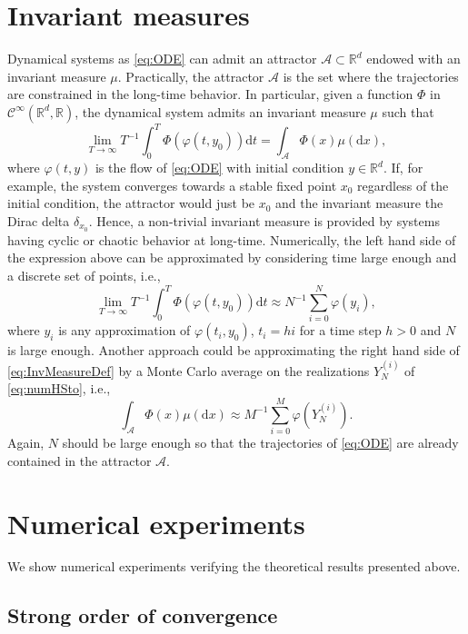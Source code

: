 \documentclass{siamart1116}
\numberwithin{theorem}{section}
\renewcommand{\phi}{\varphi}
\newcommand{\R}{\mathbb{R}}
\newcommand{\sksum}{\textstyle\sum}
\newcommand{\dd}{\mathrm{d}}
\begin{document}
\section{Invariant measures} Dynamical systems as \eqref{eq:ODE} {\color{red} can} admit an attractor $\mathcal{A} \subset \R^d$ endowed with an invariant measure $\mu$. {\color{red} Practically, the attractor $\mathcal{A}$ is the set where the trajectories are constrained in the long-time behavior.} In particular, given a function $\Phi$ in $\mathcal{C}^\infty(\R^d, \R)$, the dynamical system admits an invariant measure $\mu$ such that
\begin{equation}\label{eq:InvMeasureDef}
	\lim_{T \to \infty} T^{-1} \int_0^T \Phi(\phi(t, y_0))\dd t = \int_{\mathcal{A}} \Phi(x) \mu(\dd x),
\end{equation}
where $\phi(t, y)$ is the flow of \eqref{eq:ODE} with initial condition $y\in\R^d$. If, for example, the system converges towards a stable fixed point $x_0$ regardless of the initial condition, the attractor would just be $x_0$ and the invariant measure the Dirac delta $\delta_{x_0}$. Hence, a non-trivial invariant measure is provided by systems having cyclic or chaotic behavior at long-time. Numerically, the left hand side of the expression above can be approximated by considering time large enough and a discrete set of points, i.e.,
\begin{equation}
	\lim_{T \to \infty} T^{-1} \int_0^T \Phi(\phi(t, y_0))\dd t \approx N^{-1} \sksum_{i=0}^N \phi(y_i),
\end{equation}
where $y_i$ is any approximation of $\phi(t_i, y_0)$, $t_i = hi$ for a time step $h > 0$ and $N$ is large enough. Another approach could be approximating the right hand side of \eqref{eq:InvMeasureDef} by a Monte Carlo average on the realizations $Y^{(i)}_N$ of \eqref{eq:numHSto}, i.e.,
\begin{equation}
	\int_{\mathcal{A}} \Phi(x) \mu(\dd x) \approx M^{-1} \sksum_{i=0}^M \phi(Y^{(i)}_N).
\end{equation}
Again, $N$ should be large enough so that the trajectories of \eqref{eq:ODE} are already contained in the attractor $\mathcal{A}$.

\section{Numerical experiments} 
We show numerical experiments verifying the theoretical results presented above.

\subsection{Strong order of convergence}
\end{document}
